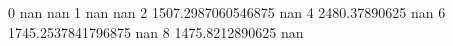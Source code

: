 0 nan nan
1 nan nan
2 1507.2987060546875 nan
4 2480.37890625 nan
6 1745.2537841796875 nan
8 1475.8212890625 nan
